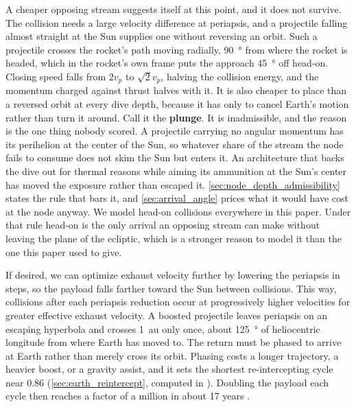 \documentclass{article}
\begin{document}
A cheaper opposing stream suggests itself at this point, and it does not survive. The collision needs a large velocity difference at periapsis, and a projectile falling almost straight at the Sun supplies one without reversing an orbit. Such a projectile crosses the rocket's path moving radially, \SI{90}{\degree} from where the rocket is headed, which in the rocket's own frame puts the approach \SI{45}{\degree} off head-on. Closing speed falls from $2v_p$ to $\sqrt{2}v_p$, halving the collision energy, and the momentum charged against thrust halves with it. It is also cheaper to place than a reversed orbit at every dive depth, because it has only to cancel Earth's motion rather than turn it around. Call it the \textbf{plunge}. It is inadmissible, and the reason is the one thing nobody scored. A projectile carrying no angular momentum has its perihelion at the center of the Sun, so whatever share of the stream the node fails to consume does not skim the Sun but enters it. An architecture that backs the dive out for thermal reasons while aiming its ammunition at the Sun's center has moved the exposure rather than escaped it. \autoref{sec:node_depth_admissibility} states the rule that bars it, and \autoref{sec:arrival_angle} prices what it would have cost at the node anyway. We model head-on collisions everywhere in this paper. Under that rule head-on is the only arrival an opposing stream can make without leaving the plane of the ecliptic, which is a stronger reason to model it than the one this paper used to give.

If desired, we can optimize exhaust velocity further by lowering the periapsis in steps, so the payload falls farther toward the Sun between collisions.  This way, collisions after each periapsis reduction occur at progressively higher velocities for greater effective exhaust velocity.   A boosted projectile leaves periapsis on an escaping hyperbola and crosses \SI{1}{\astronomicalunit} only once, about \SI{125}{\degree} of heliocentric longitude from where Earth has moved to. The return must be phased to arrive at Earth rather than merely cross its orbit. Phasing costs a longer trajectory, a heavier boost, or a gravity assist, and it sets the shortest re-intercepting cycle near \SI{0.86}{\year} (\autoref{sec:earth_reintercept}, computed in \cite{Katz_aim_is_all_you_need_2025}). Doubling the payload each cycle then reaches a factor of a million in about 17 years \cite{Katz_aim_is_all_you_need_2025}.
\end{document}
